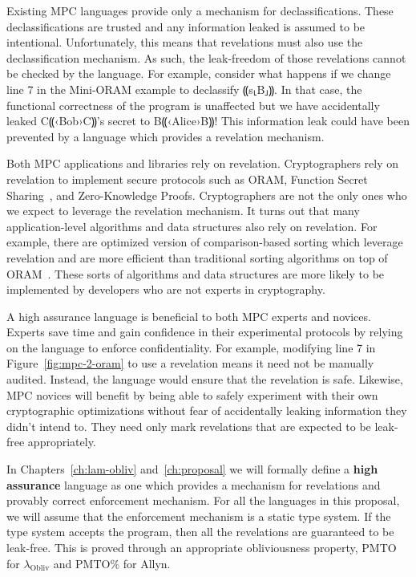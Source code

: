 \documentclass{report}
\newcommand{\lang}{Allyn\xspace}
\newcommand{\obliv}{\ensuremath{\lambda_{\mathrm{Obliv}}}\xspace}
\newcommand{\alice}{B⸨‹Alice›B⸩\xspace}
\newcommand{\bob}{C⸨‹Bob›C⸩\xspace}
\begin{document}
Existing MPC languages provide only a mechanism for declassifications. These declassifications are trusted and any
information leaked is assumed to be intentional. Unfortunately, this means that revelations must also use the
declassification mechanism. As such, the leak-freedom of those revelations cannot be checked
by the language. For example, consider what happens if we change line 7 in the Mini-ORAM example to declassify ⸨s⸤B⸥⸩.
In that case, the functional correctness of the program is unaffected but we have accidentally leaked \bob's secret to \alice!
This information leak could have been prevented by a language which provides a revelation mechanism.

Both MPC applications and libraries rely on revelation. Cryptographers rely on revelation to implement secure protocols such as ORAM,
Function Secret Sharing~\cite{}, and Zero-Knowledge Proofs\cite{}. Cryptographers are not the only ones who we expect to leverage the
revelation mechanism. It turns out that many application-level algorithms and data structures also rely on revelation. For example,
there are optimized version of comparison-based sorting which leverage revelation and are more efficient than traditional sorting
algorithms on top of ORAM~\cite{}. These sorts of algorithms and data structures are more likely to be implemented by developers who are not
experts in cryptography.

A high assurance language is beneficial to both MPC experts and novices. Experts save time and gain confidence in their
experimental protocols by relying on the language to enforce confidentiality. For example, modifying line 7 in
Figure~\ref{fig:mpc-2-oram} to use a revelation means it need not be manually audited. Instead, the language would ensure that the
revelation is safe. Likewise, MPC novices will benefit by being able to safely experiment with their own cryptographic optimizations
without fear of accidentally leaking information they didn't intend to. They need only mark revelations that are expected to be
leak-free appropriately.

In Chapters~\ref{ch:lam-obliv} and~\ref{ch:proposal} we will formally define a \textbf{high assurance} language as one which provides
a mechanism for revelations and provably correct enforcement mechanism. For all the languages in this proposal, we will
assume that the enforcement mechanism is a static type system. If the type system accepts the program, then all the revelations
are guaranteed to be leak-free. This is proved through an appropriate obliviousness property, PMTO for \obliv and PMTO\% for \lang.
\end{document}
